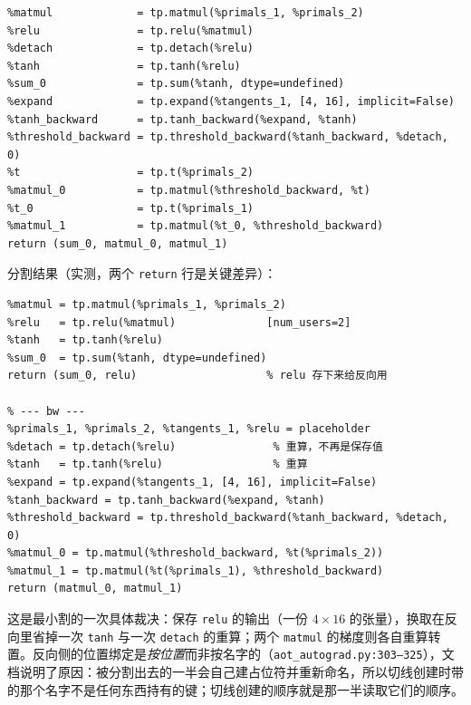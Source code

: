 \begin{lstlisting}[caption={联合图：前向与反向在同一个图里，反向节点带 \texttt{is\_backward} 标记。}, label=lst:fe:joint, style=pystyle]
%primals_1 = placeholder      %primals_2 = placeholder      %tangents_1 = placeholder
%matmul             = tp.matmul(%primals_1, %primals_2)
%relu               = tp.relu(%matmul)
%detach             = tp.detach(%relu)
%tanh               = tp.tanh(%relu)
%sum_0              = tp.sum(%tanh, dtype=undefined)
%expand             = tp.expand(%tangents_1, [4, 16], implicit=False)
%tanh_backward      = tp.tanh_backward(%expand, %tanh)
%threshold_backward = tp.threshold_backward(%tanh_backward, %detach, 0)
%t                  = tp.t(%primals_2)
%matmul_0           = tp.matmul(%threshold_backward, %t)
%t_0                = tp.t(%primals_1)
%matmul_1           = tp.matmul(%t_0, %threshold_backward)
return (sum_0, matmul_0, matmul_1)
\end{lstlisting}

分割结果（实测，两个 \texttt{return} 行是关键差异）：

\begin{lstlisting}[caption={前向图把 \texttt{relu} 的输出作为额外输出交出；反向图把它变成占位符并重算 \texttt{tanh} 与 \texttt{detach}。}, label=lst:fe:fwbw, style=pystyle]
% --- fw ---
%matmul = tp.matmul(%primals_1, %primals_2)
%relu   = tp.relu(%matmul)              [num_users=2]
%tanh   = tp.tanh(%relu)
%sum_0  = tp.sum(%tanh, dtype=undefined)
return (sum_0, relu)                    % relu 存下来给反向用

% --- bw ---
%primals_1, %primals_2, %tangents_1, %relu = placeholder
%detach = tp.detach(%relu)               % 重算，不再是保存值
%tanh   = tp.tanh(%relu)                 % 重算
%expand = tp.expand(%tangents_1, [4, 16], implicit=False)
%tanh_backward = tp.tanh_backward(%expand, %tanh)
%threshold_backward = tp.threshold_backward(%tanh_backward, %detach, 0)
%matmul_0 = tp.matmul(%threshold_backward, %t(%primals_2))
%matmul_1 = tp.matmul(%t(%primals_1), %threshold_backward)
return (matmul_0, matmul_1)
\end{lstlisting}

这是最小割的一次具体裁决：保存 \texttt{relu} 的输出（一份 $4\times16$ 的张量），换取在反向里省掉一次 \texttt{tanh} 与一次 \texttt{detach} 的重算；两个 \texttt{matmul} 的梯度则各自重算转置。反向侧的位置绑定是\emph{按位置}而非按名字的（\texttt{aot\_autograd.py:303--325}），文档说明了原因：被分割出去的一半会自己建占位符并重新命名，所以切线创建时带的那个名字不是任何东西持有的键；切线创建的顺序就是那一半读取它们的顺序。

